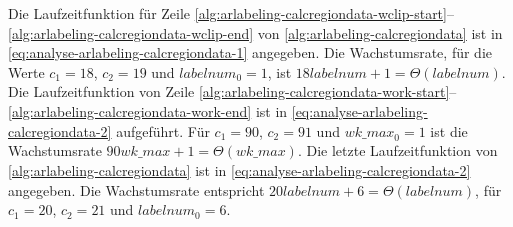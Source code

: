 Die Laufzeitfunktion für Zeile
 \ref{alg:arlabeling-calcregiondata-wclip-start}--\ref{alg:arlabeling-calcregiondata-wclip-end} von
 \autoref{alg:arlabeling-calcregiondata} ist in \autoref{eq:analyse-arlabeling-calcregiondata-1} angegeben.
Die Wachstumsrate, für die Werte $c_{1} = 18$, $c_{2} = 19$ und $\mathit{labelnum}_{0} = 1$, ist
 $18\mathit{labelnum} + 1 = \Theta(\mathit{labelnum})$. Die Laufzeitfunktion von Zeile
 \ref{alg:arlabeling-calcregiondata-work-start}--\ref{alg:arlabeling-calcregiondata-work-end} ist in
 \autoref{eq:analyse-arlabeling-calcregiondata-2} aufgeführt. Für $c_{1} = 90$, $c_{2} = 91$ und
 $\mathit{wk\_max}_{0} = 1$ ist die Wachstumsrate $90\mathit{wk\_max} + 1 = \Theta(wk\_max)$.
Die letzte Laufzeitfunktion von \autoref{alg:arlabeling-calcregiondata} ist in
 \autoref{eq:analyse-arlabeling-calcregiondata-2} angegeben.
Die Wachstumsrate entspricht $20\mathit{labelnum} + 6 = \Theta(\mathit{labelnum})$, für $c_{1} = 20$, $c_{2} = 21$ und
 $\mathit{labelnum}_{0} = 6$.





